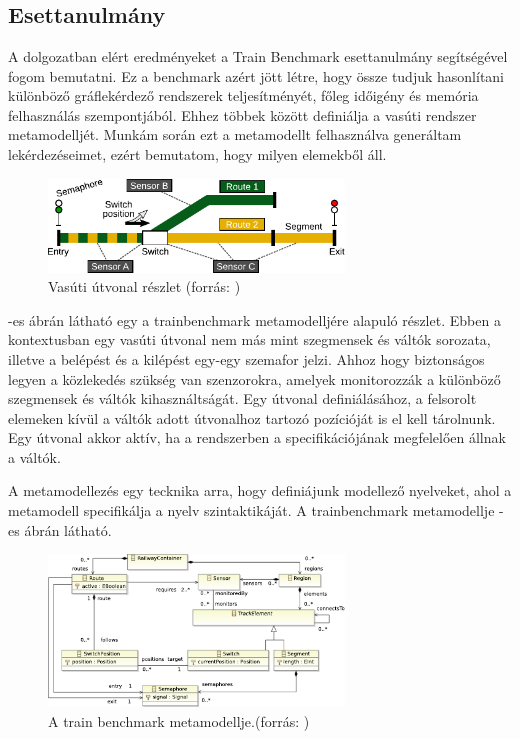 \chapter{\eloismeretek}

\section{Esettanulmány}
A dolgozatban elért eredményeket a Train Benchmark \cite{szarnyas2018train} esettanulmány 
segítségével fogom bemutatni. Ez a benchmark azért jött létre, hogy össze tudjuk hasonlítani
különböző gráflekérdező rendszerek teljesítményét, főleg időigény és memória felhasználás 
szempontjából. Ehhez többek között definiálja a vasúti rendszer metamodelljét. Munkám során
ezt a metamodellt felhasználva generáltam lekérdezéseimet, ezért bemutatom, hogy milyen elemekből áll. 

\begin{figure}
	\centering
	\includegraphics[width=0.7\textwidth]{figures/trainbenchmarkfig1}
	\caption{Vasúti útvonal részlet (forrás: \cite{szarnyas2018train})}
	\label{fig:trainbenchmark}
\end{figure}

-es ábrán látható egy a trainbenchmark metamodelljére alapuló részlet.
Ebben a kontextusban egy vasúti útvonal nem más mint szegmensek és váltók sorozata, illetve a belépést
és a kilépést egy-egy szemafor jelzi. Ahhoz hogy biztonságos legyen a közlekedés szükség van szenzorokra,
amelyek monitorozzák a különböző szegmensek és váltók kihasználtságát. Egy útvonal definiálásához, 
a felsorolt elemeken kívül a váltók adott útvonalhoz tartozó pozícióját is el kell tárolnunk. 
Egy útvonal akkor aktív, ha a rendszerben a specifikációjának megfelelően állnak a váltók.

A metamodellezés egy tecknika arra, hogy definiájunk modellező nyelveket, ahol a metamodell specifikálja 
a nyelv szintaktikáját. A trainbenchmark metamodellje  -es ábrán látható.

\begin{figure}
	\centering
	\includegraphics[width=0.7\textwidth]{figures/trainbenchmarkfig2}
	\caption{A train benchmark metamodellje.(forrás: \cite{szarnyas2018train})}
	\label{fig:trainbenchmarkmetamodell}
\end{figure}


